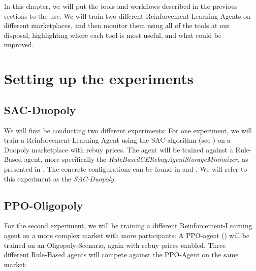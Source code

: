 \label{ch:AnalyzingGraphs}

\begin{jointwork}
	In this chapter, we will put the tools and workflows described in the previous sections to the use. We will train two different Reinforcement-Learning Agents on different marketplaces, and then monitor them using all of the tools at our disposal, highlighting where each tool is most useful, and what could be improved.
\end{jointwork}

\section*{Setting up the experiments}

\subsection*{SAC-Duopoly}

We will first be conducting two different experiments: For one experiment, we will train a Reinforcement-Learning Agent using the SAC-algorithm (see ) on a Duopoly marketplace with rebuy prices. The agent will be trained against a Rule-Based agent, more specifically the \emph{RuleBasedCERebuyAgentStorageMinimizer}, as presented in . The concrete configurations can be found in  and . We will refer to this experiment as the \emph{SAC-Duopoly}.

\subsection*{PPO-Oligopoly}

For the second experiment, we will be training a different Reinforcement-Learning agent on a more complex market with more participants: A PPO-agent () will be trained on an Oligopoly-Scenario, again with rebuy prices enabled. Three different Rule-Based agents will compete against the PPO-Agent on the same market:

